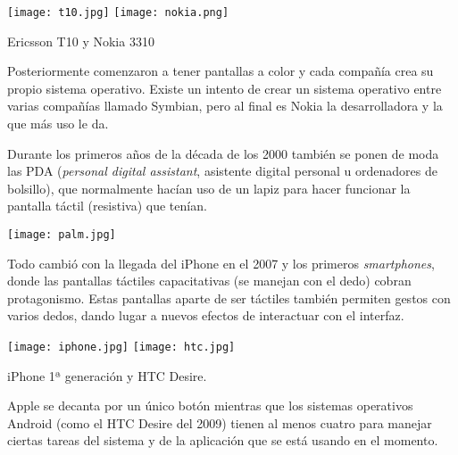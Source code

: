 {
    \hfill
    \texttt{[image: t10.jpg]}
    \hfill
    \texttt{[image: nokia.png]}
    \hfill
}

\vspace{-15pt}
\begin{center}
    {\scriptsize  Ericsson T10 y Nokia 3310}
\end{center}

Posteriormente comenzaron a tener pantallas a color y cada compañía crea su propio sistema operativo. Existe un intento de crear un sistema operativo entre varias compañías llamado Symbian, pero al final es Nokia la desarrolladora y la que más uso le da.

Durante los primeros años de la década de los 2000 también se ponen de moda las PDA (\textit{personal digital assistant}, asistente digital personal u ordenadores de bolsillo), que normalmente hacían uso de un lapiz para hacer funcionar la pantalla táctil (resistiva) que tenían.

\vspace{-10pt}
\begin{center}
    \texttt{[image: palm.jpg]}
\end{center}

Todo cambió con la llegada del iPhone en el 2007 y los primeros \textit{smartphones}, donde las pantallas táctiles capacitativas (se manejan con el dedo) cobran protagonismo. Estas pantallas aparte de ser táctiles también permiten gestos con varios dedos, dando lugar a nuevos efectos de interactuar con el interfaz.

{
    \hfill
    \texttt{[image: iphone.jpg]}
    \hfill
    \texttt{[image: htc.jpg]}
    \hfill
}

\vspace{-15pt}
\begin{center}
    {\scriptsize  iPhone 1ª generación y HTC Desire.}
\end{center}

\vspace{-15pt}

Apple se decanta por un único botón mientras que los sistemas operativos Android (como el HTC Desire del 2009) tienen al menos cuatro para manejar ciertas tareas del sistema y de la aplicación que se está usando en el momento.

